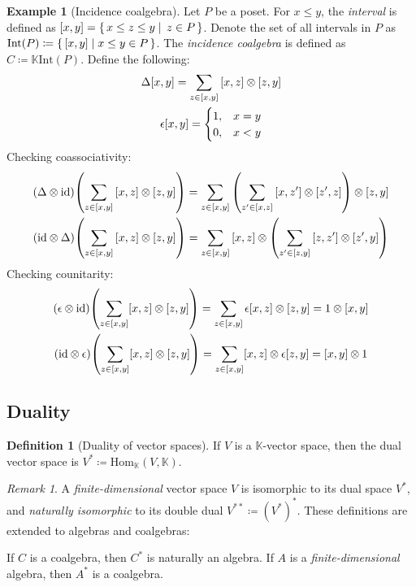 \documentclass{article}
\theoremstyle{definition}
\newtheorem{Definition}{Definition}
\newtheorem{Example}{Example}
\theoremstyle{remark}
\newtheorem*{Remark*}{Remark}
\theoremstyle{underline}
\theoremstyle{underline}
\newcommand{\id}{\mathrm{id}}
\newcommand{\Hom}{\mathrm{Hom}}
\begin{document}
	\begin{Example}[Incidence coalgebra]
		Let $P$ be a poset. For $x \leq y$, the \emph{interval} is defined as $\bqty{x,y} = \qty{\, x \leq z \leq y \mid \, z \in P \,}$. Denote the set of all intervals in $P$ as $\mathrm{Int}(P) \coloneqq \qty{\, \bqty{x,y} \mid x \leq y \in P \,}$. The \emph{incidence coalgebra} is defined as $C \coloneqq \mathbb K \mathrm{Int}(P)$. Define the following:
		\begin{gather*}
			\Delta\bqty{x,y} = \sum_{z \in [x, y]} \bqty{x,z} \otimes \bqty{z,y} \\
			\epsilon{\bqty{x,y}} =
			\begin{cases}
				1, & x = y \\
				0, & x < y
			\end{cases}
		\end{gather*}
		Checking coassociativity:
		\begin{gather*}
			\pqty{\Delta \otimes \id}\pqty{\sum_{z \in [x, y]} \bqty{x,z} \otimes \bqty{z,y}} = \sum_{z \in [x, y]}\pqty{\sum_{z' \in [x, z]} \bqty{x,z'} \otimes \bqty{z',z}} \otimes \bqty{z,y} \\
			\pqty{\id \otimes \Delta}\pqty{\sum_{z \in [x, y]} \bqty{x,z} \otimes \bqty{z,y}} = \sum_{z \in [x, y]} \bqty{x,z} \otimes \pqty{\sum_{z' \in [z, y]} \bqty{z,z'} \otimes \bqty{z',y}}
		\end{gather*}
		Checking counitarity:
		\begin{gather*}
		\pqty{\epsilon \otimes \id} \pqty{\sum_{z \in [x, y]} [x, z] \otimes [z, y]} = \sum_{z \in [x, y]} \epsilon [x, z] \otimes [z, y] = 1 \otimes [x, y]\\
		\pqty{\id \otimes \epsilon} \pqty{\sum_{z \in [x, y]} [x, z] \otimes [z, y]} = \sum_{z \in [x, y]} [x, z] \otimes \epsilon [z, y] = [x, y] \otimes 1
		\end{gather*}
	\end{Example}

	\subsection{Duality}

	\begin{Definition}[Duality of vector spaces]
		If $V$ is a $\mathbb K$-vector space, then the dual vector space is $V^* \coloneqq \Hom_{\mathbb K}(V, \mathbb K)$.
	\end{Definition}

	\begin{Remark*}
		A \emph{finite-dimensional} vector space $V$ is isomorphic to its dual space $V^*$, and \emph{naturally isomorphic} to its double dual $V^{**} \coloneqq (V^*)^*$. These definitions are extended to algebras and coalgebras:
		
		If $C$ is a coalgebra, then $C^*$ is naturally an algebra. If $A$ is a \emph{finite-dimensional} algebra, then $A^*$ is a coalgebra.
	\end{Remark*}
\end{document}
